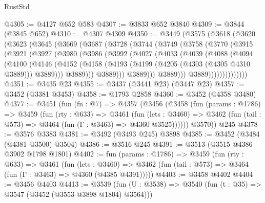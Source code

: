 \begin{lexlean}{RustStd}
\begin{coremodule}
@4305 := @4127 @652 @583
@4307 := @3833 @652 @3840
@4309 := @3844 (@3845 @652)
@4310 := @4307 @4309
@4350 := @3449
    (@3575
      (@3618
        (@3620
          (@3623
            (@3645
              (@3669
                (@3687
                  (@3728
                    (@3744
                      (@3749
                        (@3758
                          (@3770
                            (@3915
                              (@3921
                                (@3927
                                  (@3980
                                    (@3986
                                      (@3992
                                        (@4027
                                          (@4033
                                            (@4039
                                              (@4088
                                                (@4094
                                                  (@4100
                                                    (@4146
                                                      (@4152
                                                        (@4158
                                                          (@4193
                                                            (@4199
                                                              (@4205 (@4303 (@4305 @4310 @3889)))
                                                              @3889)))
                                                        @3889)))
                                                  @3889)))
                                            @3889)))
                                      @3889)))
                                @3889))))))))))))))
@4351 := @3435 @23
@4355 := @3437 (@3441 @23) (@3447 @23)
@4357 := @3452 (@3381 @3453)
@4358 := @1793 @2858
@4360 := @3452 (@4358 @3480)
@4377 := @3451
    (fun (fn : @7) =>
    @4357
      (@3456
        (@3458
          (fun (params : @1786) =>
          @3459
            (fun (rty : @633) =>
            @3461
              (fun (lets : @3460) =>
              @3462 (fun (tail : @573) => @3464 (fun (Γ : @3463) => @4360 @3525))))))
        @3570))
    @245
@4378 := @3576 @3383
@4381 := @3492 (@3493 @245) @3898
@4385 := @3452 (@3484 (@4381 @3500) @3504)
@4386 := @3516 @245
@4391 := @3513 (@3515 @4386 @3902 @1798 @1801)
@4402 := fun (params : @1786) =>
  @3459
    (fun (rty : @633) =>
    @3461
      (fun (lets : @3460) =>
      @3462 (fun (tail : @573) => @3464 (fun (Γ : @3463) => @4360 (@4385 @4391)))))
@4403 := @3458 @4402
@4404 := @3456 @4403
@4413 := @3539 (fun (U : @3538) => @3540 (fun (t : @35) => @3547 (@3452 (@3553 @3898 @1804) @3564)))

\end{coremodule}
\end{lexlean}
